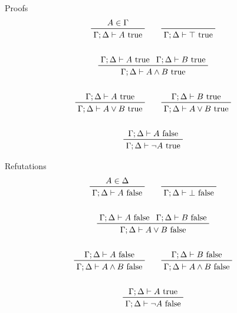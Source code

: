 \documentclass[11pt]{article}
\begin{document}
{{        \begin{minipage}[t]{0.49\textwidth}
        \centering
        Proofs
        \begin{gather*}
        \prftree[r]{}
        {A\in\Gamma}
        {\Gamma;\Delta \vdash A \text{ true}}
        \qquad
        \prftree[r]{}
        {\Gamma;\Delta \vdash \top \text{ true}}
        \\
        \\
        \prftree[r]{}
        {\Gamma;\Delta\vdash A\text{ true}}
        {\Gamma;\Delta\vdash B\text{ true}}
        {\Gamma;\Delta\vdash A \wedge B\text{ true}}
        \\
        \\
        \prftree[r]{}
        {\Gamma;\Delta\vdash A\text{ true}}
        {\Gamma;\Delta\vdash A \vee B\text{ true}}
        \qquad
        \prftree[r]{}
        {\Gamma;\Delta\vdash B\text{ true}}
        {\Gamma;\Delta\vdash A \vee B\text{ true}}
        \\
        \\
        \prftree[r]{}
        {\Gamma;\Delta\vdash A\text{ false}}
        {\Gamma;\Delta\vdash \neg A\text{ true}}
        \end{gather*}
        \end{minipage}
        \begin{minipage}[t]{0.49\textwidth}
        \centering
        Refutations
        \begin{gather*}
        \prftree[r]{}
        {A\in\Delta}
        {\Gamma;\Delta \vdash A \text{ false}}
        \qquad
        \prftree[r]{}
        {\Gamma;\Delta \vdash \bot \text{ false}}
        \\
        \\
        \prftree[r]{}
        {\Gamma;\Delta\vdash A\text{ false}}
        {\Gamma;\Delta\vdash B\text{ false}}
        {\Gamma;\Delta\vdash A \vee B\text{ false}}
        \\
        \\
        \prftree[r]{}
        {\Gamma;\Delta\vdash A\text{ false}}
        {\Gamma;\Delta\vdash A \wedge B\text{ false}}
        \qquad
        \prftree[r]{}
        {\Gamma;\Delta\vdash B\text{ false}}
        {\Gamma;\Delta\vdash A \wedge B\text{ false}}
        \\
        \\
        \prftree[r]{}
        {\Gamma;\Delta\vdash A\text{ true}}
        {\Gamma;\Delta\vdash \neg A\text{ false}}
        \end{gather*}
        \end{minipage}

}}
\end{document}
